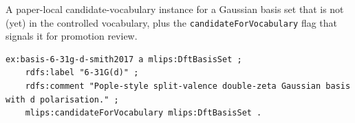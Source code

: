 A paper-local candidate-vocabulary instance for a Gaussian basis set
that is not (yet) in the controlled vocabulary, plus the
\texttt{candidateForVocabulary} flag that signals it for promotion review.
\begin{lstlisting}[language=turtle]
ex:basis-6-31g-d-smith2017 a mlips:DftBasisSet ;
    rdfs:label "6-31G(d)" ;
    rdfs:comment "Pople-style split-valence double-zeta Gaussian basis with d polarisation." ;
    mlips:candidateForVocabulary mlips:DftBasisSet .
\end{lstlisting}
